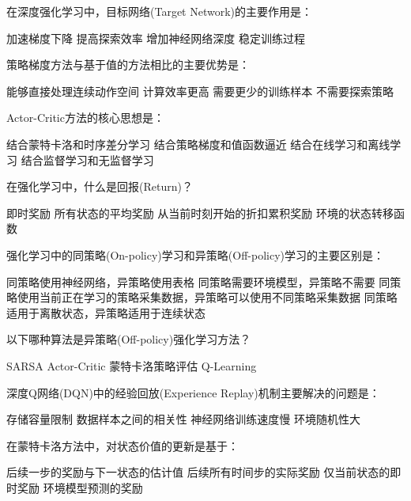 \documentclass[zihao=5,answers]{BHCexam}
\begin{document}
\begin{questions}
\question 在深度强化学习中，目标网络(Target Network)的主要作用是：
\begin{choices}
    \choice 加速梯度下降
    \choice 提高探索效率
    \choice 增加神经网络深度
    \CorrectChoice 稳定训练过程
\end{choices}

\question 策略梯度方法与基于值的方法相比的主要优势是：
\begin{choices}
    \CorrectChoice 能够直接处理连续动作空间
    \choice 计算效率更高
    \choice 需要更少的训练样本
    \choice 不需要探索策略
\end{choices}

\question Actor-Critic方法的核心思想是：
\begin{choices}
    \choice 结合蒙特卡洛和时序差分学习
    \CorrectChoice 结合策略梯度和值函数逼近
    \choice 结合在线学习和离线学习
    \choice 结合监督学习和无监督学习
\end{choices}

\question 在强化学习中，什么是回报(Return)？
\begin{choices}
    \choice 即时奖励
    \choice 所有状态的平均奖励
    \CorrectChoice 从当前时刻开始的折扣累积奖励
    \choice 环境的状态转移函数
\end{choices}

\question 强化学习中的同策略(On-policy)学习和异策略(Off-policy)学习的主要区别是：
\begin{choices}
    \choice 同策略使用神经网络，异策略使用表格
    \choice 同策略需要环境模型，异策略不需要
    \CorrectChoice 同策略使用当前正在学习的策略采集数据，异策略可以使用不同策略采集数据
    \choice 同策略适用于离散状态，异策略适用于连续状态
\end{choices}

\question 以下哪种算法是异策略(Off-policy)强化学习方法？
\begin{choices}
    \choice SARSA
    \choice Actor-Critic
    \choice 蒙特卡洛策略评估
    \CorrectChoice Q-Learning
\end{choices}

\question 深度Q网络(DQN)中的经验回放(Experience Replay)机制主要解决的问题是：
\begin{choices}
    \choice 存储容量限制
    \CorrectChoice 数据样本之间的相关性
    \choice 神经网络训练速度慢
    \choice 环境随机性大
\end{choices}

\question 在蒙特卡洛方法中，对状态价值的更新是基于：
\begin{choices}
    \choice 后续一步的奖励与下一状态的估计值
    \CorrectChoice 后续所有时间步的实际奖励
    \choice 仅当前状态的即时奖励
    \choice 环境模型预测的奖励
\end{choices}


\end{questions}
\end{document}
